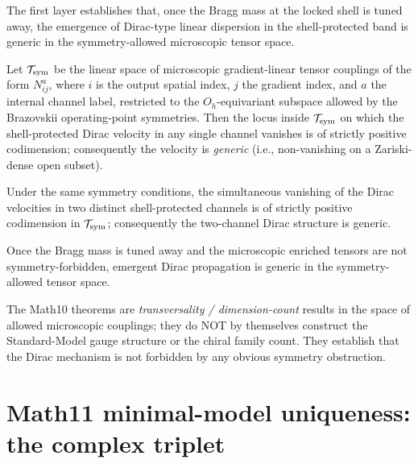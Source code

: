 The first layer establishes that, once the Bragg mass at the locked
shell is tuned away, the emergence of Dirac-type linear dispersion in
the shell-protected band is generic in the symmetry-allowed
microscopic tensor space.

\begin{theorem}
\label{thm:single-channel-genericity}
Let $\mathcal{T}_{\rm sym}$ be the linear space of microscopic
gradient-linear tensor couplings of the form
$N_{ij}^a$, where $i$ is the output spatial index, $j$ the gradient
index, and $a$ the internal channel label, restricted to the
$O_h$-equivariant subspace allowed by the Brazovskii operating-point
symmetries. Then the locus inside $\mathcal{T}_{\rm sym}$ on which
the shell-protected Dirac velocity in any single channel vanishes is
of strictly positive codimension; consequently the velocity is
\emph{generic} (i.e., non-vanishing on a Zariski-dense open subset).
\end{theorem}

\begin{theorem}
\label{thm:two-channel-genericity}
Under the same symmetry conditions, the simultaneous vanishing of
the Dirac velocities in two distinct shell-protected channels is of
strictly positive codimension in $\mathcal{T}_{\rm sym}$;
consequently the two-channel Dirac structure is generic.
\end{theorem}

\begin{principle}
\label{prn:Dirac-genericity}
Once the Bragg mass is tuned away and the microscopic enriched
tensors are not symmetry-forbidden, emergent Dirac propagation is
generic in the symmetry-allowed tensor space.
\end{principle}

\begin{remark}
The Math10 theorems are \emph{transversality / dimension-count}
results in the space of allowed microscopic couplings; they do NOT
by themselves construct the Standard-Model gauge structure or the
chiral family count. They establish that the Dirac mechanism is not
forbidden by any obvious symmetry obstruction.
\end{remark}

\section{Math11 minimal-model uniqueness: the complex
triplet}\label{sec:Math11}

